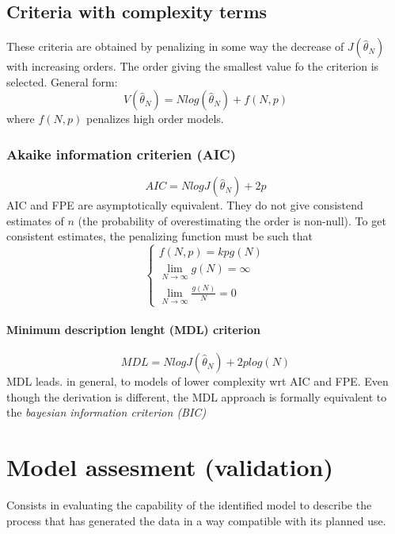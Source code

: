 \documentclass{book}
\theoremstyle{definition}
\theoremstyle{remark}
\theoremstyle{remark}
\begin{document}
\section{Criteria with complexity terms}
These criteria are obtained by penalizing in some way the decrease of $J(\hat{\theta}_N)$with increasing orders. The order giving the smallest value fo the criterion is selected.
General form:
\[
    V(\hat{\theta}_N)=Nlog(\hat{\theta}_N)+f(N,p)
\]
where $f(N,p)$ penalizes high order models.

\subsection{Akaike information criterien (AIC)}
\[
    AIC=NlogJ(\hat{\theta}_N)+2p
\]
AIC and FPE are asymptotically equivalent. They do not give consistend estimates of $n$ (the probability of overestimating the order is non-null). To get consistent estimates, the penalizing function must be such that
\[
    \begin{cases}
        f(N,p)=kpg(N)\\
        \lim_{N\to\infty}g(N)=\infty\\
        \lim_{N\to\infty}\displaystyle\frac{g(N)}{N}=0
    \end{cases}
\]
\subsubsection{Minimum description lenght (MDL) criterion}
\[
    MDL=N logJ(\hat{\theta}_N)+2plog(N)
\]
MDL leads. in general, to models of lower complexity wrt AIC and FPE. Even though the derivation is different, the MDL approach is formally equivalent to  the \emph{bayesian information criterion (BIC)}




\chapter{Model assesment (validation)}

Consists in evaluating the capability of the identified model to describe the process that has generated the data in a way compatible with its planned use. 
\end{document}

